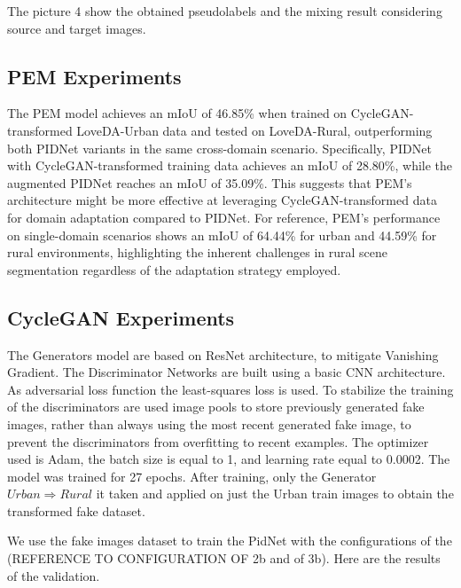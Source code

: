 \documentclass[10pt,twocolumn,letterpaper]{article}
\begin{document}
The picture 4 show the obtained pseudolabels and the mixing result considering source and target images. 


\subsection{PEM Experiments}
The PEM model achieves an mIoU of 46.85\% when trained on CycleGAN-transformed LoveDA-Urban data and tested on LoveDA-Rural, outperforming both PIDNet variants in the same cross-domain scenario. Specifically, PIDNet with CycleGAN-transformed training data achieves an mIoU of 28.80\%, while the augmented PIDNet reaches an mIoU of 35.09\%. This suggests that PEM's architecture might be more effective at leveraging CycleGAN-transformed data for domain adaptation compared to PIDNet. For reference, PEM's performance on single-domain scenarios shows an mIoU of 64.44\% for urban and 44.59\% for rural environments, highlighting the inherent challenges in rural scene segmentation regardless of the adaptation strategy employed.

\subsection{CycleGAN Experiments}
The Generators model are based on ResNet architecture, to mitigate Vanishing Gradient. The Discriminator Networks are built using a basic CNN architecture. As adversarial loss function the least-squares loss is used. To stabilize the training of the discriminators are used image pools to store previously generated fake images, rather than always using the most recent generated fake image, to prevent the discriminators from overfitting to recent examples. The optimizer used is Adam, the batch size is equal to 1, and learning rate equal to 0.0002. The model was trained for 27 epochs. 
After training, only the Generator $Urban \Rightarrow Rural$
it taken and applied on just the Urban train images to obtain the transformed fake dataset.


We use the fake images dataset to train the PidNet with the configurations of the (REFERENCE TO CONFIGURATION OF 2b and of 3b). Here are the results of the validation.


\begin{table}[ht]
\centering
{}
\caption{Performance of PIDNet on Fake Images}
\end{table}
\end{document}
